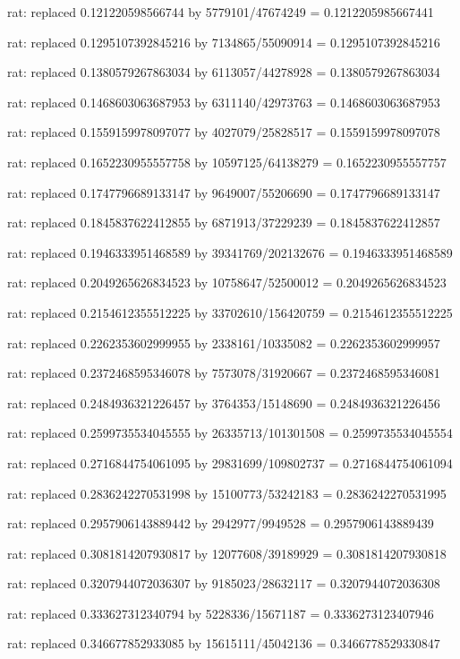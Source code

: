 \documentclass[a4paper,10pt]{article}
\begin{document}
\begin{eulernotebook}
\begin{eulercomment}
\begin{eulercomment}
\begin{eulercomment}
\begin{eulercomment}
\begin{eulercomment}
\begin{eulercomment}
\begin{eulercomment}
\begin{eulercomment}
\begin{eulercomment}
\begin{eulercomment}
\begin{eulercomment}
\begin{eulercomment}
\begin{eulercomment}
\begin{eulercomment}
\begin{eulercomment}
\begin{eulercomment}
\begin{euleroutput}
  rat: replaced 0.121220598566744 by 5779101/47674249 = 0.1212205985667441
  
  rat: replaced 0.1295107392845216 by 7134865/55090914 = 0.1295107392845216
  
  rat: replaced 0.1380579267863034 by 6113057/44278928 = 0.1380579267863034
  
  rat: replaced 0.1468603063687953 by 6311140/42973763 = 0.1468603063687953
  
  rat: replaced 0.1559159978097077 by 4027079/25828517 = 0.1559159978097078
  
  rat: replaced 0.1652230955557758 by 10597125/64138279 = 0.1652230955557757
  
  rat: replaced 0.1747796689133147 by 9649007/55206690 = 0.1747796689133147
  
  rat: replaced 0.1845837622412855 by 6871913/37229239 = 0.1845837622412857
  
  rat: replaced 0.1946333951468589 by 39341769/202132676 = 0.1946333951468589
  
  rat: replaced 0.2049265626834523 by 10758647/52500012 = 0.2049265626834523
  
  rat: replaced 0.2154612355512225 by 33702610/156420759 = 0.2154612355512225
  
  rat: replaced 0.2262353602999955 by 2338161/10335082 = 0.2262353602999957
  
  rat: replaced 0.2372468595346078 by 7573078/31920667 = 0.2372468595346081
  
  rat: replaced 0.2484936321226457 by 3764353/15148690 = 0.2484936321226456
  
  rat: replaced 0.2599735534045555 by 26335713/101301508 = 0.2599735534045554
  
  rat: replaced 0.2716844754061095 by 29831699/109802737 = 0.2716844754061094
  
  rat: replaced 0.2836242270531998 by 15100773/53242183 = 0.2836242270531995
  
  rat: replaced 0.2957906143889442 by 2942977/9949528 = 0.2957906143889439
  
  rat: replaced 0.3081814207930817 by 12077608/39189929 = 0.3081814207930818
  
  rat: replaced 0.3207944072036307 by 9185023/28632117 = 0.3207944072036308
  
  rat: replaced 0.333627312340794 by 5228336/15671187 = 0.3336273123407946
  
  rat: replaced 0.346677852933085 by 15615111/45042136 = 0.3466778529330847
  

\end{euleroutput}
\end{eulercomment}
\end{eulercomment}
\end{eulercomment}
\end{eulercomment}
\end{eulercomment}
\end{eulercomment}
\end{eulercomment}
\end{eulercomment}
\end{eulercomment}
\end{eulercomment}
\end{eulercomment}
\end{eulercomment}
\end{eulercomment}
\end{eulercomment}
\end{eulercomment}
\end{eulercomment}
\end{eulernotebook}
\end{document}
